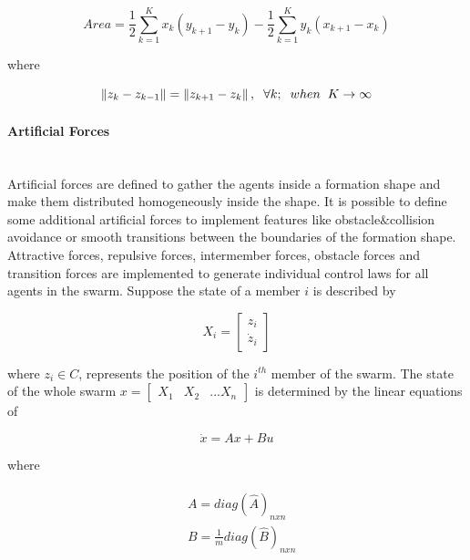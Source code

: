 \begin{equation}
Area = \frac{1}{2} \sum_{k=1}^{K} x_k(y_{k+1} - y_k) - \frac{1}{2} \sum_{k=1}^{K}y_k(x_{k+1} - x_k)
\end{equation}
			
where

\begin{equation}
\left\lVert z_k - z_{k-1}\right\rVert = \left\lVert z_{k+1} - z_k\right\rVert, \hspace{0.2cm}  \forall k ;  \hspace{0.2cm} when  \hspace{0.2cm} K \to\infty
\end{equation}

\paragraph{Artificial Forces}\hspace{0pt} \\ 
Artificial forces are defined to gather the agents inside a formation shape and make them distributed homogeneously inside the shape. It is possible to define some additional artificial forces to implement features like obstacle$\&$collision avoidance or smooth transitions between the boundaries of the formation shape. Attractive forces, repulsive forces, intermember forces, obstacle forces and transition forces are implemented to generate individual control laws for all agents in the swarm. Suppose the state of a member $i$ is described by

\begin{equation}
X_i = \begin{bmatrix}
z_i\\ \dot{z}_i
\end{bmatrix}
\end{equation}

where  $z_i \in C$, represents the position of the $i^{th}$ member of the swarm. The state of the whole swarm $x= \begin{bmatrix}
X_1 & X_2 & ... X_n
\end{bmatrix}$ is determined by the linear equations of \cite{17}

\begin{equation}
\dot{x} = Ax + Bu
\end{equation}

where

\begin{align}
\begin{split}
&A = diag\left(\hat{A}\right)_{nxn}\\
&B = \frac{1}{m} diag\left(\hat{B}\right)_{nxn}
\end{split}
\end{align}
			
